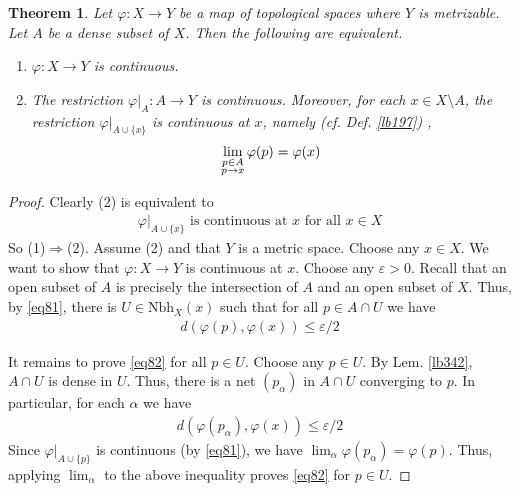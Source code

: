 \documentclass[12pt,b5paper,notitlepage]{article}
\theoremstyle{definition}
\theoremstyle{plain}
\newtheorem{thm}[df]{Theorem}
\newcommand{\Nbh}{\mathrm{Nbh}}
\newcommand{\eps}{\varepsilon}
\numberwithin{equation}{section}
\begin{document}
\begin{thm}\label{lb276}
Let $\varphi:X\rightarrow Y$ be a map of topological spaces where $Y$ is metrizable. Let $A$ be a dense subset of $X$. Then the following are equivalent.
\begin{enumerate}[label=(\arabic*)]
\item $\varphi:X\rightarrow Y$ is continuous.
\item The restriction $\varphi|_A:A\rightarrow Y$ is continuous. Moreover, for each $x\in X\setminus A$, the restriction $\varphi|_{A\cup\{x\}}$ is continuous at $x$, namely (cf. Def. \ref{lb197}) ,
\begin{align}
\lim_{
\begin{subarray}{c}
p\in A\\
p\rightarrow x
\end{subarray}
}\varphi(p)=\varphi(x)
\end{align}
\end{enumerate}
\end{thm}




\begin{proof}
Clearly (2) is equivalent to
\begin{align}\label{eq81}
\varphi|_{A\cup\{x\}}\text{ is continuous at $x$ for all $x\in X$}
\end{align}
So (1)$\Rightarrow$(2). Assume (2) and that $Y$ is a metric space. Choose any $x\in X$. We want to show that $\varphi:X\rightarrow Y$ is continuous at $x$. Choose any $\eps>0$. Recall that an open subset of $A$ is precisely the intersection of $A$ and an open subset of $X$. Thus, by \eqref{eq81}, there is $U\in\Nbh_X(x)$ such that for all $p\in A\cap U$ we have
\begin{align}
d(\varphi(p),\varphi(x))\leq \eps/2\label{eq82}
\end{align}


It remains to prove \eqref{eq82} for all $p\in U$. Choose any $p\in U$. By Lem. \ref{lb342}, $A\cap U$ is dense in $U$.  Thus, there is a net $(p_\alpha)$ in $A\cap U$ converging to $p$. In particular, for each $\alpha$ we have
\begin{align*}
d(\varphi(p_\alpha),\varphi(x))\leq \eps/2
\end{align*}
Since $\varphi|_{A\cup\{p\}}$ is continuous (by \eqref{eq81}), we have $\lim_\alpha\varphi(p_\alpha)=\varphi(p)$. Thus, applying $\lim_\alpha$ to the above inequality proves \eqref{eq82} for $p\in U$.
\end{proof}
\end{document}
